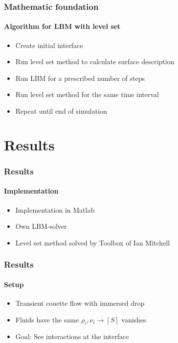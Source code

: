 \documentclass[ucs]{beamer}
\begin{document}
\begin{frame}
\frametitle{Mathematic foundation}
\framesubtitle{Algorithm for LBM with level set}
\begin{itemize}
\item<1-> Create initial interface
\item<2-> Run level set method to calculate surface description
\item<3-> Run LBM for a prescribed number of steps
\item<4-> Run level set method for the same time interval
\item<5-> Repeat until end of simulation
\end{itemize}
\end{frame}

\section{Results}
\begin{frame}
\frametitle{Results}
\framesubtitle{Implementation}
\begin{itemize}
\item<1-> Implementation in Matlab
\item<2-> Own LBM-solver
\item<3-> Level set method solved by Toolbox of Ian Mitchell
\end{itemize}
\end{frame}

\begin{frame}
\frametitle{Results}
\framesubtitle{Setup}
\begin{itemize}
\item<1-> Transient couette flow with immersed drop
\item<2-> Fluids have the same $\rho_i, \nu_i \rightarrow [S]$ vanishes
\item<3-> Goal: See interactions at the interface
\end{itemize}
\end{frame}
\end{document}
